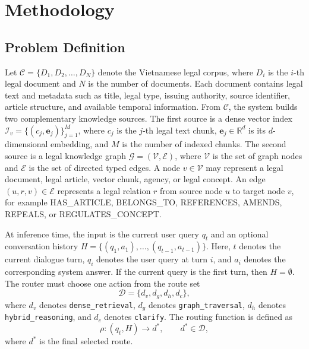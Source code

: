 \documentclass[11pt,twocolumn]{article}
\begin{document}
\section{Methodology}
\label{sec:methodology}

\subsection{Problem Definition}
\label{subsec:problem_definition}

Let $\mathcal{C}=\{D_1,D_2,\ldots,D_N\}$ denote the
Vietnamese legal corpus, where $D_i$ is the $i$-th legal
document and $N$ is the number of documents. Each document
contains legal text and metadata such as title, legal type,
issuing authority, source identifier, article structure, and
available temporal information. From $\mathcal{C}$, the
system builds two complementary knowledge sources. The first
source is a dense vector index
$\mathcal{I}_v=\{(c_j,\mathbf{e}_j)\}_{j=1}^{M}$, where
$c_j$ is the $j$-th legal text chunk, $\mathbf{e}_j\in
\mathbb{R}^{d}$ is its $d$-dimensional embedding, and $M$ is
the number of indexed chunks. The second source is a legal
knowledge graph $\mathcal{G}=(\mathcal{V},\mathcal{E})$,
where $\mathcal{V}$ is the set of graph nodes and
$\mathcal{E}$ is the set of directed typed edges. A node
$v\in\mathcal{V}$ may represent a legal document, legal
article, vector chunk, agency, or legal concept. An edge
$(u,r,v)\in\mathcal{E}$ represents a legal relation $r$ from
source node $u$ to target node $v$, for example
\textsc{HAS\_ARTICLE}, \textsc{BELONGS\_TO},
\textsc{REFERENCES}, \textsc{AMENDS}, \textsc{REPEALS}, or
\textsc{REGULATES\_CONCEPT}.

At inference time, the input is the current user query $q_t$
and an optional conversation history
$H=\{(q_1,a_1),\ldots,(q_{t-1},a_{t-1})\}$. Here, $t$
denotes the current dialogue turn, $q_i$ denotes the user
query at turn $i$, and $a_i$ denotes the corresponding
system answer. If the current query is the first turn, then
$H=\emptyset$. The router must choose one action from the
route set
\begin{equation}
\mathcal{D}=\{d_v,d_g,d_h,d_c\},
\label{eq:route_set}
\end{equation}
where $d_v$ denotes \texttt{dense\_retrieval}, $d_g$ denotes
\texttt{graph\_traversal}, $d_h$ denotes
\texttt{hybrid\_reasoning}, and $d_c$ denotes
\texttt{clarify}. The routing function is defined as
\begin{equation}
\rho:(q_t,H)\rightarrow d^*, \qquad d^*\in\mathcal{D},
\label{eq:routing_function}
\end{equation}
where $d^*$ is the final selected route.
\end{document}
